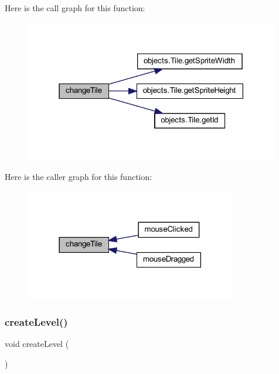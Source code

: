 Here is the call graph for this function\+:\nopagebreak
\begin{figure}[H]
\begin{center}
\leavevmode
\includegraphics[width=315pt]{classscenes_1_1_editing_afbbb0a60fd2d899ff81c1715fce5fc73_cgraph}
\end{center}
\end{figure}
Here is the caller graph for this function\+:\nopagebreak
\begin{figure}[H]
\begin{center}
\leavevmode
\includegraphics[width=261pt]{classscenes_1_1_editing_afbbb0a60fd2d899ff81c1715fce5fc73_icgraph}
\end{center}
\end{figure}
\mbox{\label{classscenes_1_1_editing_ad79f312dd3a9e52f38a9e5f1536537fd}} 
\subsubsection{\texorpdfstring{create\+Level()}{createLevel()}}
{\footnotesize\ttfamily void create\+Level (\begin{DoxyParamCaption}{ }\end{DoxyParamCaption})}



